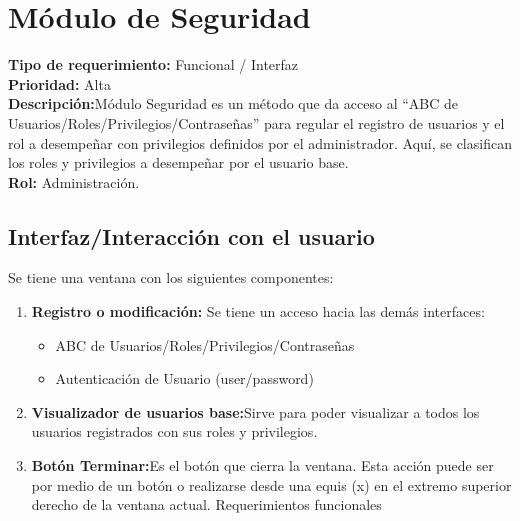 \documentclass[a4paper,DIV=12]{scrreprt}
\begin{document}
\newpage
\setcounter{chapter}{3}
\setcounter{section}{-1}
\setcounter{subsection}{-1}
\section{Módulo de Seguridad}
\noindent
\textbf{Tipo de requerimiento:} Funcional / Interfaz\\
\textbf{Prioridad:} Alta\\
\textbf{Descripción:}Módulo Seguridad es un método  que da acceso al “ABC de Usuarios/Roles/Privilegios/Contraseñas”  para regular el registro de usuarios y el rol a desempeñar con privilegios definidos por el administrador. Aquí, se clasifican los roles y privilegios a desempeñar por el usuario base. \\
\textbf{Rol:} Administración.
\subsection*{Interfaz/Interacción con el usuario}

Se tiene una ventana con los siguientes componentes: 

\begin{enumerate}
	\item{\textbf{Registro o modificación:} Se tiene un acceso hacia las demás interfaces: }
	\begin{itemize}
		\item{ABC de Usuarios/Roles/Privilegios/Contraseñas}
		\item{Autenticación de Usuario (user/password)}	
	\end{itemize}
	
	\item{\textbf{Visualizador de usuarios base:}Sirve para poder visualizar a todos los usuarios registrados con sus roles y privilegios.}
	\item{\textbf{Botón Terminar:}Es el botón que cierra la ventana. Esta acción puede ser por medio de un botón o realizarse desde una equis (x) en el extremo superior derecho de la ventana actual. Requerimientos funcionales }
\end{enumerate}
\end{document}
